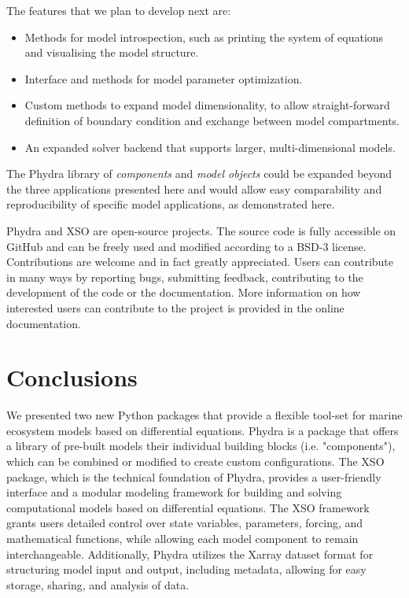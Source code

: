 \documentclass[journal abbreviation, manuscript]{copernicus}
\begin{document}
The features that we plan to develop next are: 

\begin{itemize}
    \item Methods for model introspection, such as printing the system of equations and visualising the model structure.
    \item Interface and methods for model parameter optimization.
    \item Custom methods to expand model dimensionality, to allow straight-forward definition of boundary condition and exchange between model compartments.
    \item An expanded solver backend that supports larger, multi-dimensional models.
\end{itemize}

The Phydra library of \textit{components} and \textit{model objects} could be expanded beyond the three applications presented here and would allow easy comparability and reproducibility of specific model applications, as demonstrated here.

Phydra and XSO are open-source projects. The source code is fully accessible on GitHub and can be freely used and modified according to a BSD-3 license. Contributions are welcome and in fact greatly appreciated. Users can contribute in many ways by reporting bugs, submitting feedback, contributing to the development of the code or the documentation. More information on how interested users can contribute to the project is provided in the online documentation.


\section{Conclusions}


We presented two new Python packages that provide a flexible tool-set for marine ecosystem models based on differential equations. Phydra is a package that offers a library of pre-built models their individual building blocks (i.e. "components"), which can be combined or modified to create custom configurations. The XSO package, which is the technical foundation of Phydra, provides a user-friendly interface and a modular modeling framework for building and solving computational models based on differential equations. The XSO framework grants users detailed control over state variables, parameters, forcing, and mathematical functions, while allowing each model component to remain interchangeable. Additionally, Phydra utilizes the Xarray dataset format for structuring model input and output, including metadata, allowing for easy storage, sharing, and analysis of data.
\end{document}
